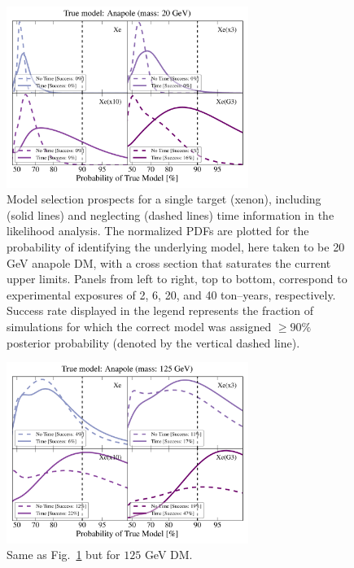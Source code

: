\documentclass[11pt, a4paper]{article}
\begin{document}
\begin{figure}
\centering
\includegraphics[width=0.7\textwidth]{plots/PDF_20GeV_Anapole_50sims_Xe_Xe3x_Xe10x_XeG3_GF_TNT.pdf}
\caption{\label{fig:20gev_anapole_XeFull_TNT_GF}
Model selection prospects for a single target (xenon), including (solid lines) and neglecting (dashed lines) time information in the likelihood analysis. The normalized PDFs are plotted for the probability of identifying the underlying model, here taken to be 20 GeV anapole DM, with a cross section that saturates the current upper limits. Panels from left to right, top to bottom, correspond to experimental exposures of 2, 6, 20, and 40 ton--years, respectively. Success rate displayed in the legend represents the fraction of simulations for which the correct model was assigned $ \geq 90\%$ posterior probability (denoted by the vertical dashed line).}

\end{figure}
\begin{figure}
\centering
\includegraphics[width=0.7\textwidth]{plots/PDF_125GeV_Anapole_50sims_Xe_Xe3x_Xe10x_XeG3_GF_TNT.pdf}
\caption{\label{fig:125gev_anapole_XeFull_TNT_GF}
Same as Fig.~\ref{fig:20gev_anapole_XeFull_TNT_GF} but for $125$ GeV DM.}
\end{figure}
\end{document}
